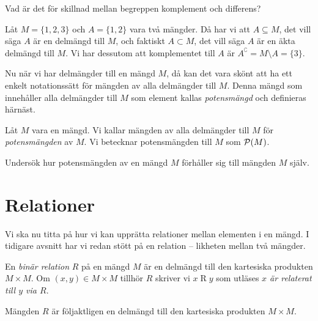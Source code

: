 \begin{exercise}
  Vad är det för skillnad mellan begreppen komplement och differens?
\end{exercise}

\begin{example}
  Låt \(M=\{1,2,3\}\) och \(A=\{1,2\}\) vara två mängder.
  Då har vi att \(A\subseteq M\), det vill säga \(A\) är en delmängd till
  \(M\), och faktiskt \(A\subset M\), det vill säga \(A\) är en äkta delmängd
  till \(M\).
  Vi har dessutom att komplementet till \(A\) är \(A^\complement =
  M\setminus A = \{3\}\).
\end{example}

Nu när vi har delmängder till en mängd \(M\), då kan det vara skönt att ha ett
enkelt notationssätt för mängden av alla delmängder till \(M\).
Denna mängd som innehåller alla delmängder till \(M\) som element kallas
\emph{potensmängd} och definieras härnäst.
\begin{definition}\label{def:Potensmangd}
  Låt \(M\) vara en mängd.
  Vi kallar mängden av alla delmängder till \(M\) för \emph{potensmängden}
  av \(M\).
  Vi betecknar potensmängden till \(M\) som \(\mathcal{P}(M)\).
\end{definition}
\begin{exercise}
  Undersök hur potensmängden av en mängd \(M\) förhåller sig till mängden
  \(M\) själv.
\end{exercise}


\section{Relationer}\label{Relationer}

Vi ska nu titta på hur vi kan upprätta relationer mellan
elementen i en mängd.
I tidigare avsnitt har vi redan stött på en relation -- likheten mellan två
mängder.

\begin{definition}\label{def:BinarRelation}
  En \emph{binär relation} \(R\) på en mängd \(M\) är en delmängd till den
  kartesiska produkten \(M\times M\).
  Om \((x,y)\in M\times M\) tillhör \(R\) skriver vi \(x\mathop R y\) som 
  utläses
  \emph{\(x\) är relaterat till \(y\) via \(R\)}.
\end{definition}

\begin{remark}\label{RelationDelmangdTillKartesiskProdukt}
  Mängden \(R\) är följaktligen en delmängd till den kartesiska produkten
  \(M\times M\).
\end{remark}

